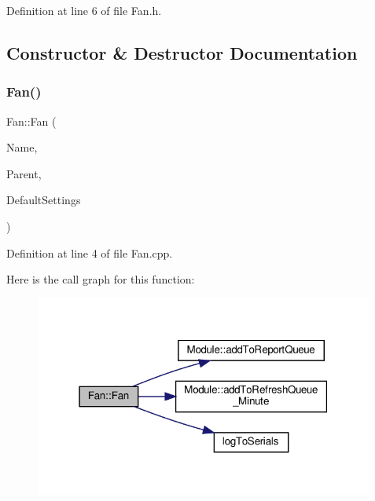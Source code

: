 Definition at line 6 of file Fan.\+h.



\subsection{Constructor \& Destructor Documentation}
\mbox{\label{class_fan_a2bf10abddbcad94045ad7e3d567f17b8}} 
\subsubsection{\texorpdfstring{Fan()}{Fan()}\hspace{0.1cm}{\footnotesize\ttfamily [1/2]}}
{\footnotesize\ttfamily Fan\+::\+Fan (\begin{DoxyParamCaption}\item[{const \+\_\+\+\_\+\+Flash\+String\+Helper $\ast$}]{Name,  }\item[{\hyperlink{class_module}{Module} $\ast$}]{Parent,  }\item[{\hyperlink{struct_settings_1_1_fan_settings}{Settings\+::\+Fan\+Settings} $\ast$}]{Default\+Settings }\end{DoxyParamCaption})}



Definition at line 4 of file Fan.\+cpp.

Here is the call graph for this function\+:
\nopagebreak
\begin{figure}[H]
\begin{center}
\leavevmode
\includegraphics[width=316pt]{class_fan_a2bf10abddbcad94045ad7e3d567f17b8_cgraph}
\end{center}
\end{figure}
\mbox{\label{class_fan_a2bf10abddbcad94045ad7e3d567f17b8}} 
